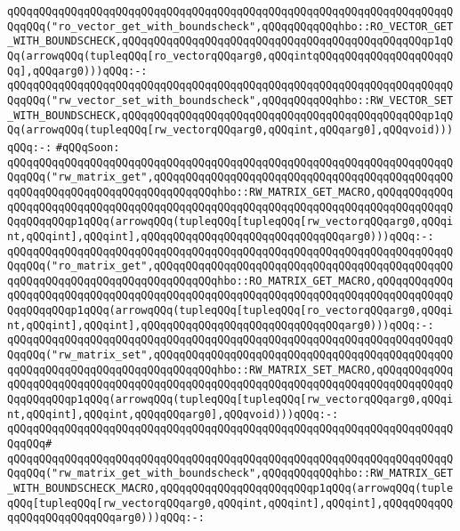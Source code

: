 \verb|qQQqqQQqqQQqqQQqqQQqqQQqqQQqqQQqqQQqqQQqqQQqqQQqqQQqqQQqqQQqqQQqqQQqqQQqqQQq("ro_vector_get_with_boundscheck",qQQqqQQqqQQqhbo::RO_VECTOR_GET_WITH_BOUNDSCHECK,qQQqqQQqqQQqqQQqqQQqqQQqqQQqqQQqqQQqqQQqqQQqqQQqp1qQQq(arrowqQQq(tupleqQQq[ro_vectorqQQqarg0,qQQqintqQQqqQQqqQQqqQQqqQQqqQQq],qQQqarg0)))qQQq:-:|\newline
\verb|qQQqqQQqqQQqqQQqqQQqqQQqqQQqqQQqqQQqqQQqqQQqqQQqqQQqqQQqqQQqqQQqqQQqqQQqqQQq("rw_vector_set_with_boundscheck",qQQqqQQqqQQqhbo::RW_VECTOR_SET_WITH_BOUNDSCHECK,qQQqqQQqqQQqqQQqqQQqqQQqqQQqqQQqqQQqqQQqqQQqqQQqp1qQQq(arrowqQQq(tupleqQQq[rw_vectorqQQqarg0,qQQqint,qQQqarg0],qQQqvoid)))qQQq:-:|\newline
\newline
\verb|#qQQqSoon:|\newline
\verb|qQQqqQQqqQQqqQQqqQQqqQQqqQQqqQQqqQQqqQQqqQQqqQQqqQQqqQQqqQQqqQQqqQQqqQQqqQQq("rw_matrix_get",qQQqqQQqqQQqqQQqqQQqqQQqqQQqqQQqqQQqqQQqqQQqqQQqqQQqqQQqqQQqqQQqqQQqqQQqqQQqqQQqhbo::RW_MATRIX_GET_MACRO,qQQqqQQqqQQqqQQqqQQqqQQqqQQqqQQqqQQqqQQqqQQqqQQqqQQqqQQqqQQqqQQqqQQqqQQqqQQqqQQqqQQqqQQqqQQqp1qQQq(arrowqQQq(tupleqQQq[tupleqQQq[rw_vectorqQQqarg0,qQQqint,qQQqint],qQQqint],qQQqqQQqqQQqqQQqqQQqqQQqqQQqqQQqarg0)))qQQq:-:|\newline
\verb|qQQqqQQqqQQqqQQqqQQqqQQqqQQqqQQqqQQqqQQqqQQqqQQqqQQqqQQqqQQqqQQqqQQqqQQqqQQq("ro_matrix_get",qQQqqQQqqQQqqQQqqQQqqQQqqQQqqQQqqQQqqQQqqQQqqQQqqQQqqQQqqQQqqQQqqQQqqQQqqQQqqQQqhbo::RO_MATRIX_GET_MACRO,qQQqqQQqqQQqqQQqqQQqqQQqqQQqqQQqqQQqqQQqqQQqqQQqqQQqqQQqqQQqqQQqqQQqqQQqqQQqqQQqqQQqqQQqqQQqp1qQQq(arrowqQQq(tupleqQQq[tupleqQQq[ro_vectorqQQqarg0,qQQqint,qQQqint],qQQqint],qQQqqQQqqQQqqQQqqQQqqQQqqQQqqQQqarg0)))qQQq:-:|\newline
\verb|qQQqqQQqqQQqqQQqqQQqqQQqqQQqqQQqqQQqqQQqqQQqqQQqqQQqqQQqqQQqqQQqqQQqqQQqqQQq("rw_matrix_set",qQQqqQQqqQQqqQQqqQQqqQQqqQQqqQQqqQQqqQQqqQQqqQQqqQQqqQQqqQQqqQQqqQQqqQQqqQQqqQQqhbo::RW_MATRIX_SET_MACRO,qQQqqQQqqQQqqQQqqQQqqQQqqQQqqQQqqQQqqQQqqQQqqQQqqQQqqQQqqQQqqQQqqQQqqQQqqQQqqQQqqQQqqQQqqQQqp1qQQq(arrowqQQq(tupleqQQq[tupleqQQq[rw_vectorqQQqarg0,qQQqint,qQQqint],qQQqint,qQQqqQQqarg0],qQQqvoid)))qQQq:-:|\newline
\verb|qQQqqQQqqQQqqQQqqQQqqQQqqQQqqQQqqQQqqQQqqQQqqQQqqQQqqQQqqQQqqQQqqQQqqQQqqQQq#|\newline
\verb|qQQqqQQqqQQqqQQqqQQqqQQqqQQqqQQqqQQqqQQqqQQqqQQqqQQqqQQqqQQqqQQqqQQqqQQqqQQq("rw_matrix_get_with_boundscheck",qQQqqQQqqQQqhbo::RW_MATRIX_GET_WITH_BOUNDSCHECK_MACRO,qQQqqQQqqQQqqQQqqQQqqQQqp1qQQq(arrowqQQq(tupleqQQq[tupleqQQq[rw_vectorqQQqarg0,qQQqint,qQQqint],qQQqint],qQQqqQQqqQQqqQQqqQQqqQQqqQQqarg0)))qQQq:-:|\newline
